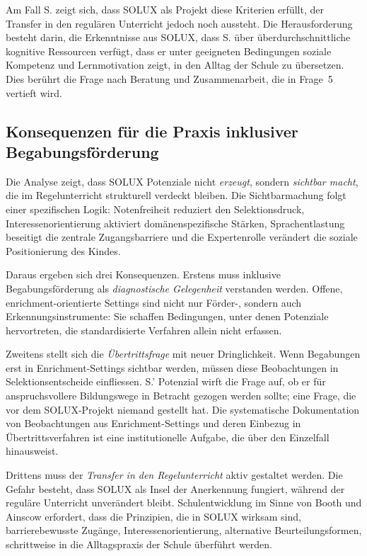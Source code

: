 \documentclass[ngerman, a4paper]{article}
\begin{document}
Am Fall S. zeigt sich, dass SOLUX als Projekt diese Kriterien erfüllt, der Transfer
in den regulären Unterricht jedoch noch aussteht. Die Herausforderung besteht darin,
die Erkenntnisse aus SOLUX, dass S. über überdurchschnittliche kognitive Ressourcen
verfügt, dass er unter geeigneten Bedingungen soziale Kompetenz und Lernmotivation
zeigt, in den Alltag der Schule zu übersetzen. Dies berührt die Frage nach
Beratung und Zusammenarbeit, die in Frage~5 vertieft wird.

\subsection{Konsequenzen für die Praxis inklusiver Begabungsförderung}

Die Analyse zeigt, dass SOLUX Potenziale nicht \textit{erzeugt}, sondern
\textit{sichtbar macht}, die im Regelunterricht strukturell verdeckt bleiben. Die
Sichtbarmachung folgt einer spezifischen Logik: Notenfreiheit reduziert den
Selektionsdruck, Interessenorientierung aktiviert domänenspezifische Stärken,
Sprachentlastung beseitigt die zentrale Zugangsbarriere und die Expertenrolle
verändert die soziale Positionierung des Kindes.

Daraus ergeben sich drei Konsequenzen. Erstens muss inklusive Begabungsförderung
als \textit{diagnostische Gelegenheit} verstanden werden. Offene, enrichment-orientierte
Settings sind nicht nur Förder-, sondern auch Erkennungsinstrumente: Sie schaffen
Bedingungen, unter denen Potenziale hervortreten, die standardisierte Verfahren
allein nicht erfassen.

Zweitens stellt sich die \textit{Übertrittsfrage} mit neuer Dringlichkeit. Wenn
Begabungen erst in Enrichment-Settings sichtbar werden, müssen diese Beobachtungen
in Selektionsentscheide einfliessen. S.' Potenzial wirft die Frage auf, ob er für
anspruchsvollere Bildungswege in Betracht gezogen werden sollte; eine Frage, die vor
dem SOLUX-Projekt niemand gestellt hat. Die systematische Dokumentation von
Beobachtungen aus Enrichment-Settings und deren Einbezug in Übertrittsverfahren ist
eine institutionelle Aufgabe, die über den Einzelfall hinausweist.

Drittens muss der \textit{Transfer in den Regelunterricht} aktiv gestaltet werden.
Die Gefahr besteht, dass SOLUX als Insel der Anerkennung fungiert, während der
reguläre Unterricht unverändert bleibt. Schulentwicklung im Sinne von Booth und
Ainscow erfordert, dass die Prinzipien, die in SOLUX wirksam sind, barrierebewusste
Zugänge, Interessenorientierung, alternative Beurteilungsformen, schrittweise
in die Alltagspraxis der Schule überführt werden.
 
\end{document}
